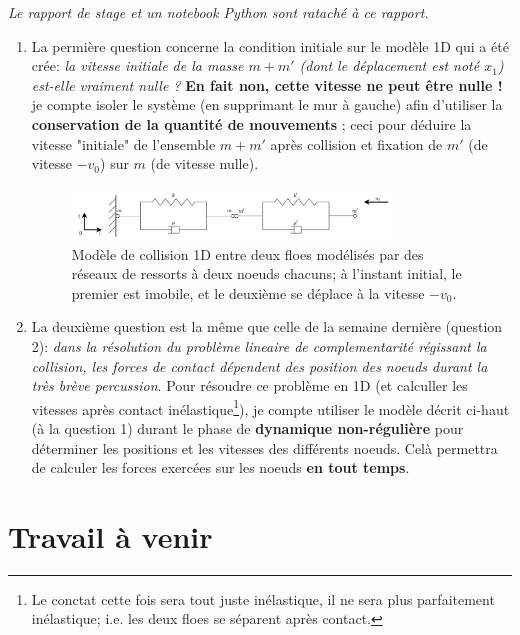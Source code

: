 \documentclass[
  french,
	11pt, %
]{fphw}
\begin{document}
\textit{Le rapport de stage et un notebook Python sont rataché à ce rapport.}

\begin{enumerate}
  \item La permière question concerne la condition initiale sur le modèle 1D qui a été crée: \textit{la vitesse initiale de la masse $m+m'$ (dont le déplacement est noté $x_1$) est-elle vraiment nulle ?} \textbf{En fait non, cette vitesse ne peut être nulle !} je compte isoler le système (en supprimant le mur à gauche) afin d'utiliser la \textbf{conservation de la quantité de mouvements} ; ceci pour déduire la vitesse "initiale" de l'ensemble $m+m'$ après collision et fixation de $m'$ (de vitesse $-v_0$) sur $m$ (de vitesse nulle).
  \begin{figure}[H]
    \centering
    \includegraphics[width=0.8\textwidth]{Percussion1D-Systeme.png}
    \caption{Modèle de collision 1D entre deux floes modélisés par des réseaux de ressorts à deux noeuds chacuns; à l'instant initial, le premier est imobile, et le deuxième se déplace à la vitesse $-v_0$.}
  \end{figure}
  \item La deuxième question est la même que celle de la semaine dernière (question 2): \textit{dans la résolution du problème lineaire de complementarité régissant la collision, les forces de contact dépendent des position des noeuds durant la très brève percussion}. Pour résoudre ce problème en 1D (et calculler les vitesses après contact inélastique\footnote{Le conctat cette fois sera tout juste inélastique, il ne sera plus parfaitement inélastique; i.e. les deux floes se séparent après contact.}), je compte utiliser le modèle décrit ci-haut (à la question 1) durant le phase de \textbf{dynamique non-régulière} pour déterminer les positions et les vitesses des différents noeuds. Celà permettra de calculer les forces exercées sur les noeuds \textbf{en tout temps}.
\end{enumerate}


\section*{Travail à venir}
\end{document}
